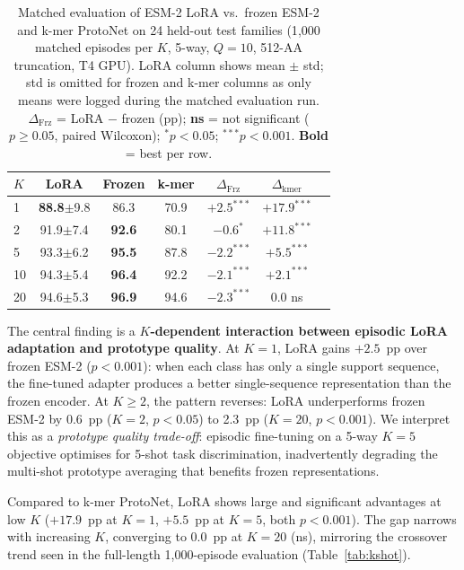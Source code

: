 \documentclass[11pt,a4paper]{article}
\begin{document}
\begin{table}[H]
\centering
\caption{Matched evaluation of ESM-2 LoRA vs.\ frozen ESM-2 and k-mer ProtoNet
         on 24 held-out test families (1{,}000 matched episodes per $K$, 5-way,
         $Q=10$, 512-AA truncation, T4 GPU).
         LoRA column shows mean $\pm$ std; std is omitted for frozen and k-mer
         columns as only means were logged during the matched evaluation run.
         $\Delta_{\mathrm{Frz}}$ = LoRA $-$ frozen (pp); \textbf{ns} = not significant
         ($p \geq 0.05$, paired Wilcoxon); $^{*}p < 0.05$; $^{***}p < 0.001$.
         \textbf{Bold} = best per row.}
\label{tab:lora}
\small
\setlength{\tabcolsep}{5pt}
\begin{tabular}{lcccccc}
\toprule
$K$ & \textbf{LoRA} & \textbf{Frozen} & \textbf{k-mer} &
    $\Delta_{\mathrm{Frz}}$ & $\Delta_{\mathrm{kmer}}$ \\
\midrule
 1 & \textbf{88.8}$\pm$9.8 & 86.3 & 70.9 & $+2.5^{***}$ & $+17.9^{***}$ \\
 2 & 91.9$\pm$7.4  & \textbf{92.6} & 80.1 & $-0.6^{*}$   & $+11.8^{***}$ \\
 5 & 93.3$\pm$6.2  & \textbf{95.5} & 87.8 & $-2.2^{***}$ & $+5.5^{***}$  \\
10 & 94.3$\pm$5.4  & \textbf{96.4} & 92.2 & $-2.1^{***}$ & $+2.1^{***}$  \\
20 & 94.6$\pm$5.3  & \textbf{96.9} & 94.6 & $-2.3^{***}$ & $0.0$ ns      \\
\bottomrule
\end{tabular}
\end{table}

The central finding is a \textbf{$K$-dependent interaction between episodic
LoRA adaptation and prototype quality}.  At $K=1$, LoRA gains $+2.5$~pp over
frozen ESM-2 ($p < 0.001$): when each class has only a single support sequence,
the fine-tuned adapter produces a better single-sequence representation than the
frozen encoder.  At $K \geq 2$, the pattern reverses: LoRA underperforms frozen
ESM-2 by 0.6~pp ($K=2$, $p < 0.05$) to 2.3~pp ($K=20$, $p < 0.001$).  We
interpret this as a \emph{prototype quality trade-off}: episodic fine-tuning on
a 5-way $K{=}5$ objective optimises for 5-shot task discrimination, inadvertently
degrading the multi-shot prototype averaging that benefits frozen representations.

Compared to k-mer ProtoNet, LoRA shows large and significant advantages at low
$K$ ($+17.9$~pp at $K=1$, $+5.5$~pp at $K=5$, both $p < 0.001$).  The gap
narrows with increasing $K$, converging to 0.0~pp at $K=20$ (ns), mirroring
the crossover trend seen in the full-length 1{,}000-episode evaluation
(Table~\ref{tab:kshot}).
\end{document}
